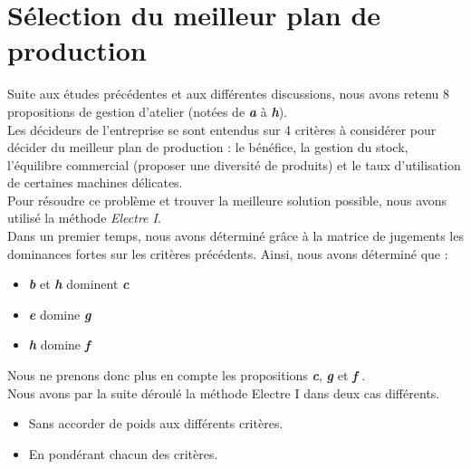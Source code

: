 \documentclass[12pt]{article}
\begin{document}
\section{Sélection du meilleur plan de production}
Suite aux études précédentes et aux différentes discussions, nous avons retenu 8 propositions de gestion d'atelier (notées de \textbf{\emph{a}} à \textbf{\emph{h}}).\\
Les décideurs de l'entreprise se sont entendus sur 4 critères à considérer pour décider du meilleur plan de production : le bénéfice, la gestion du stock, l'équilibre commercial (proposer une diversité de produits) et le taux d'utilisation de certaines machines délicates.\\
Pour résoudre ce problème et trouver la meilleure solution possible, nous avons utilisé la méthode \emph{Electre I}.\\
Dans un premier temps, nous avons déterminé grâce à la matrice de jugements les dominances fortes sur les critères précédents. Ainsi, nous avons déterminé que :
\begin{itemize}
\item \textbf{\emph{b}} et \textbf{\emph{h}} dominent \textbf{\emph{c}}
\item \textbf{\emph{e}} domine \textbf{\emph{g}}
\item \textbf{\emph{h}} domine \textbf{\emph{f}}
\end{itemize}
Nous ne prenons donc plus en compte les propositions \textbf{\emph{c}}, \textbf{\emph{g}} et \textbf{\emph{f}} .\\
Nous avons par la suite déroulé la méthode Electre I dans deux cas différents. 
\begin{itemize}
\item Sans accorder de poids aux différents critères.
\item En pondérant chacun des critères.
\end{itemize}
\end{document}
